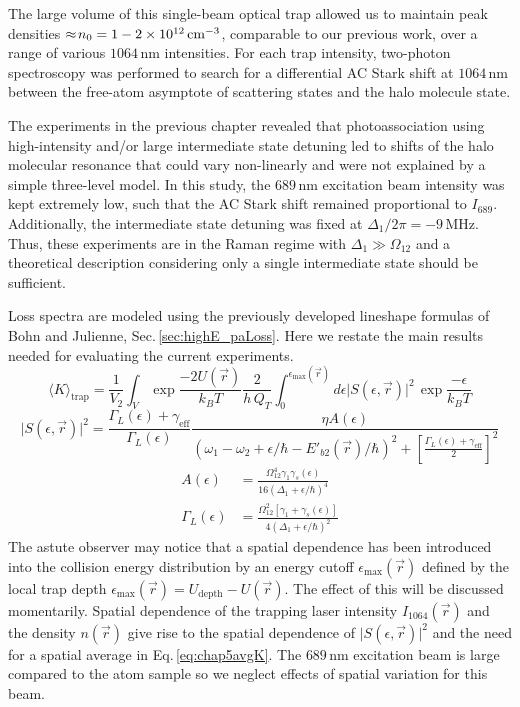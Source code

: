 The large volume of this single-beam optical trap allowed us to maintain peak densities $\approx\!n_0 = 1-2 \times 10^{12} \, \text{cm}^{-3}$, comparable to our previous work, over a range of various $1064$\,nm intensities.
For each trap intensity, two-photon spectroscopy was performed to search for a differential AC Stark shift at $1064\,\text{nm}$ between the free-atom asymptote of scattering states and the halo molecule state.

The experiments in the previous chapter revealed that photoassociation using high-intensity and/or large intermediate state detuning led to shifts of the halo molecular resonance that could vary non-linearly and were not explained by a simple three-level model.
In this study, the $689$\,nm excitation beam intensity was kept extremely low, such that the AC Stark shift remained proportional to $I_{689}$.
Additionally, the intermediate state detuning was fixed at $\Delta_1/2 \pi = -9$\,MHz.
Thus, these experiments are in the Raman regime with $\Delta_1 \gg \Omega_{12}$ and a theoretical description considering only a single intermediate state should be sufficient.


Loss spectra are modeled using the previously developed lineshape formulas of Bohn and Julienne, Sec.\,\ref{sec:highE_paLoss}.
Here we restate the main results needed for evaluating the current experiments.
\begingroup
\addtolength{\jot}{1em}
\begin{equation} \label{eq:chap5avgK}
	\langle K \rangle_\text{trap} = \frac{1}{V_2} \int_V \exp{\frac{-2 U(\vec{r})}{k_{B}T}} \frac{2}{h\,Q_{T}} \int_{0}^{\epsilon_{\text{max}}(\vec{r})} d\epsilon \vert S(\epsilon, \vec{r}) \vert^2 \,\exp{\frac{-\epsilon}{k_{B}T}}
\end{equation}
\begin{equation}\label{5equationApproxLorentzian}
  \vert S(\epsilon, \vec{r}) \vert^2 = \frac{\Gamma_L(\epsilon)+\gamma_{\text{eff}}}{\Gamma_L(\epsilon)} \frac{\eta  A(\epsilon)} {\left(\omega_1-\omega_2+\epsilon/\hbar-E'_{b2}(\vec{r})/\hbar\right)^2+\left[
  	\frac{\Gamma_L(\epsilon)+\gamma_{\text{eff}}}{2}\right]^2}
\end{equation}
\begin{align}
  A(\epsilon) &= \frac{\Omega_{12}^{4}\gamma_1 \gamma_s(\epsilon)}{16(\Delta_1+\epsilon/\hbar)^4} \\
  \Gamma_L(\epsilon) &= \frac{\Omega_{12}^{2}[\gamma_1 +\gamma_s(\epsilon)]}{4(\Delta_1+\epsilon/\hbar)^2}
\end{align}
\endgroup
The astute observer may notice that a spatial dependence has been introduced into the collision energy distribution by an energy cutoff $\epsilon_{\text{max}}(\vec{r})$ defined by the local trap depth $\epsilon_{\text{max}}(\vec{r}) = U_{\text{depth}} - U(\vec{r})$.
The effect of this will be discussed momentarily.
Spatial dependence of the trapping laser intensity $I_{1064}(\vec{r})$ and the density $n(\vec{r})$ give rise to the spatial dependence of $\vert S(\epsilon, \vec{r}) \vert^2$ and the need for a spatial average in Eq.\,\ref{eq:chap5avgK}.
The $689$\,nm excitation beam is large compared to the atom sample so we neglect effects of spatial variation for this beam.

